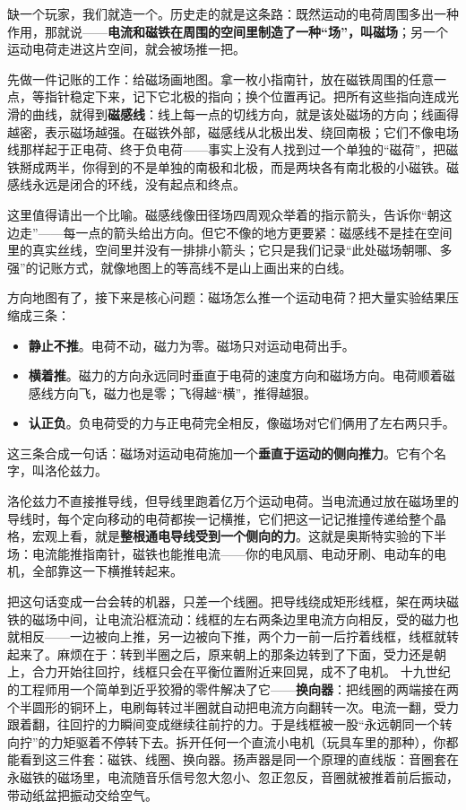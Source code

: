 
\begin{mainline}
缺一个玩家，我们就造一个。历史走的就是这条路：既然运动的电荷周围多出一种作用，那就说——\textbf{电流和磁铁在周围的空间里制造了一种“场”，叫磁场}；另一个运动电荷走进这片空间，就会被场推一把。

先做一件记账的工作：给磁场画地图。拿一枚小指南针，放在磁铁周围的任意一点，等指针稳定下来，记下它北极的指向；换个位置再记。把所有这些指向连成光滑的曲线，就得到\textbf{磁感线}：线上每一点的切线方向，就是该处磁场的方向；线画得越密，表示磁场越强。在磁铁外部，磁感线从北极出发、绕回南极；它们不像电场线那样起于正电荷、终于负电荷——事实上没有人找到过一个单独的“磁荷”，把磁铁掰成两半，你得到的不是单独的南极和北极，而是两块各有南北极的小磁铁。磁感线永远是闭合的环线，没有起点和终点。

这里值得请出一个比喻。磁感线像田径场四周观众举着的指示箭头，告诉你“朝这边走”——每一点的箭头给出方向。但它不像的地方更要紧：磁感线不是挂在空间里的真实丝线，空间里并没有一排排小箭头；它只是我们记录“此处磁场朝哪、多强”的记账方式，就像地图上的等高线不是山上画出来的白线。

方向地图有了，接下来是核心问题：磁场怎么推一个运动电荷？把大量实验结果压缩成三条：

\begin{itemize}
  \item \textbf{静止不推}。电荷不动，磁力为零。磁场只对运动电荷出手。
  \item \textbf{横着推}。磁力的方向永远同时垂直于电荷的速度方向和磁场方向。电荷顺着磁感线方向飞，磁力也是零；飞得越“横”，推得越狠。
  \item \textbf{认正负}。负电荷受的力与正电荷完全相反，像磁场对它们俩用了左右两只手。
\end{itemize}

这三条合成一句话：磁场对运动电荷施加一个\textbf{垂直于运动的侧向推力}。它有个名字，叫洛伦兹力。

洛伦兹力不直接推导线，但导线里跑着亿万个运动电荷。当电流通过放在磁场里的导线时，每个定向移动的电荷都挨一记横推，它们把这一记记推撞传递给整个晶格，宏观上看，就是\textbf{整根通电导线受到一个侧向的力}。这就是奥斯特实验的下半场：电流能推指南针，磁铁也能推电流——你的电风扇、电动牙刷、电动车的电机，全部靠这一下横推转起来。

把这句话变成一台会转的机器，只差一个线圈。把导线绕成矩形线框，架在两块磁铁的磁场中间，让电流沿框流动：线框的左右两条边里电流方向相反，受的磁力也就相反——一边被向上推，另一边被向下推，两个力一前一后拧着线框，线框就转起来了。麻烦在于：转到半圈之后，原来朝上的那条边转到了下面，受力还是朝上，合力开始往回拧，线框只会在平衡位置附近来回晃，成不了电机。 十九世纪的工程师用一个简单到近乎狡猾的零件解决了它——\textbf{换向器}：把线圈的两端接在两个半圆形的铜环上，电刷每转过半圈就自动把电流方向翻转一次。电流一翻，受力跟着翻，往回拧的力瞬间变成继续往前拧的力。于是线框被一股“永远朝同一个转向拧”的力矩驱着不停转下去。拆开任何一个直流小电机（玩具车里的那种），你都能看到这三件套：磁铁、线圈、换向器。扬声器是同一个原理的直线版：音圈套在永磁铁的磁场里，电流随音乐信号忽大忽小、忽正忽反，音圈就被推着前后振动，带动纸盆把振动交给空气。


\end{mainline}
